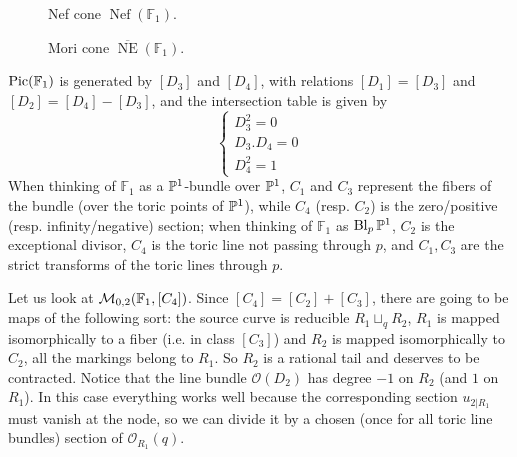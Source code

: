 \begin{figure}
\caption{Nef cone $\operatorname{Nef}(\mathbb F_1)$.}
\end{figure}

\begin{figure}
\caption{Mori cone $\overline{\operatorname{NE}}(\mathbb F_1)$.}
\end{figure}

$\operatorname{Pic}(\mathbb F_1)$ is generated by $[D_3]$ and $[D_4]$, with relations $[D_1]=[D_3]$ and $[D_2]=[D_4]-[D_3]$, and the intersection table is given by
\[
{}
\begin{cases}
 D_3^2=0 \\
 D_3.D_4=0 \\
 D_4^2=1
\end{cases} 
\]
When thinking of $\mathbb F_1$ as a $\mathbb P^1$-bundle over $\mathbb P^1$, $C_1$ and $C_3$ represent the fibers of the bundle (over the toric points of $\mathbb P^1$), while $C_4$ (resp. $C_2$) is the zero/positive (resp. infinity/negative) section; when thinking of $\mathbb F_1$ as $\operatorname{Bl}_{p}\mathbb P^1$, $C_2$ is the exceptional divisor, $C_4$ is the toric line not passing through $p$, and $C_1,C_3$ are the strict transforms of the toric lines through $p$.

Let us look at $\mathcal{M}_{0,2}(\mathbb F_1,[C_4])$. Since $[C_4]=[C_2]+[C_3]$, there are going to be maps of the following sort: the source curve is reducible $R_1\sqcup_q R_2$, $R_1$ is mapped isomorphically to a fiber (i.e. in class $[C_3]$) and $R_2$ is mapped isomorphically to $C_2$, all the markings belong to $R_1$. So $R_2$ is a rational tail and deserves to be contracted. Notice that the line bundle $\mathcal O(D_2)$ has degree $-1$ on $R_2$ (and $1$ on $R_1$). In this case everything works well because the corresponding section $u_{2|R_1}$ must vanish at the node, so we can divide it by a chosen (once for all toric line bundles) section of $\mathcal O_{R_1}(q)$.

